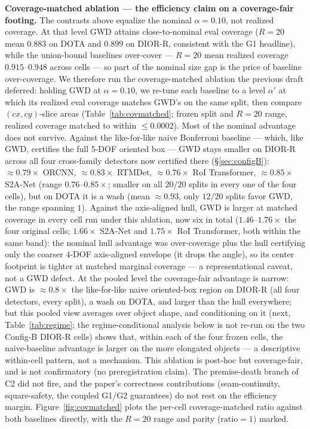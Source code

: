 \documentclass[11pt]{article}
\begin{document}
\textbf{Coverage-matched ablation --- the efficiency claim on a coverage-fair footing.} The contrasts
above equalize the nominal $\alpha=0.10$, not realized coverage. At that level GWD attains
close-to-nominal eval coverage ($R{=}20$ mean $0.883$ on DOTA and $0.899$ on DIOR-R, consistent with the
G1 headline), while the union-bound baselines over-cover --- $R{=}20$ mean realized coverage
$0.915$--$0.948$ across cells --- so part of the nominal size gap is the price of baseline over-coverage.
We therefore run the coverage-matched ablation the previous draft deferred: holding GWD at $\alpha=0.10$,
we re-tune each baseline to a level $\alpha'$ at which its realized eval coverage matches GWD's on
the same split, then compare $(cx,cy)$-slice areas (Table~\ref{tab:covmatched}; frozen split and $R{=}20$
range, realized coverage matched to within $\le 0.0002$).
Most of the nominal advantage does not survive. Against the like-for-like naive Bonferroni
baseline --- which, like GWD, certifies the full $5$-DOF oriented box --- GWD stays smaller on DIOR-R across
all four cross-family detectors now certified there (\S\ref{sec:configB}): $\approx0.79\times$ ORCNN,
$\approx0.83\times$ RTMDet, $\approx0.76\times$ RoI Transformer, $\approx0.85\times$ S2A-Net (range
$0.76$--$0.85\times$; smaller on all $20/20$ splits in every one of the four cells),
but on DOTA it is a wash (mean $\approx0.93$, only $12/20$ splits favor GWD, the range spanning
$1$). Against the axis-aligned hull, GWD is larger at matched coverage in every cell run under this
ablation, now six in total ($1.46$--$1.76\times$ the four original cells; $1.66\times$ S2A-Net and
$1.75\times$ RoI Transformer, both within the same band): the nominal hull advantage was over-coverage
plus the hull certifying only
the coarser $4$-DOF axis-aligned envelope (it drops the angle), so its center footprint is tighter at
matched marginal coverage --- a representational caveat, not a GWD defect. At the pooled level the
coverage-fair advantage is narrow: GWD is $\approx0.8\times$ the like-for-like naive oriented-box region
on DIOR-R (all four detectors, every split), a wash on DOTA, and larger than the hull everywhere; but this
pooled view averages over object shape, and conditioning on it (next, Table~\ref{tab:regime}; the
regime-conditional analysis below is not re-run on the two Config-B DIOR-R cells) shows that,
within each of the four frozen cells, the naive-baseline advantage is larger on the more elongated
objects --- a descriptive within-cell pattern, not a mechanism. This ablation is post-hoc but coverage-fair, and is
not confirmatory (no preregistration claim). The premise-death branch of C2 did not fire, and the
paper's correctness contributions (seam-continuity, square-safety, the coupled G1/G2 guarantees) do not
rest on the efficiency margin. Figure~\ref{fig:covmatched} plots the per-cell coverage-matched ratio
against both baselines directly, with the $R{=}20$ range and parity ($\mathrm{ratio}=1$) marked.
\end{document}
